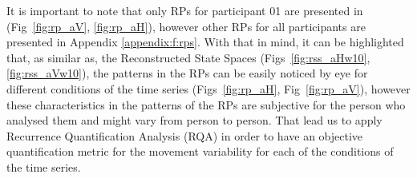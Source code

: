 It is important to note that only RPs for participant 01 are presented
in (Fig~\ref{fig:rp_aV}, \ref{fig:rp_aH}), however
other RPs for all participants are presented in Appendix \ref{appendix:f:rps}.
With that in mind, it can be highlighted that, as similar as, the 
Reconstructed State Spaces (Figs~\ref{fig:rss_aHw10}, \ref{fig:rss_aVw10}), 
the patterns in the RPs can be easily noticed by eye for different conditions 
of the time series (Figs~\ref{fig:rp_aH}, Fig~\ref{fig:rp_aV}),
however these characteristics in the patterns of the RPs are subjective 
for the person who analysed them and might vary from person to person. 
That lead us to apply Recurrence Quantification Analysis (RQA) in order 
to have an objective quantification metric for the movement variability 
for each of the conditions of the time series.
